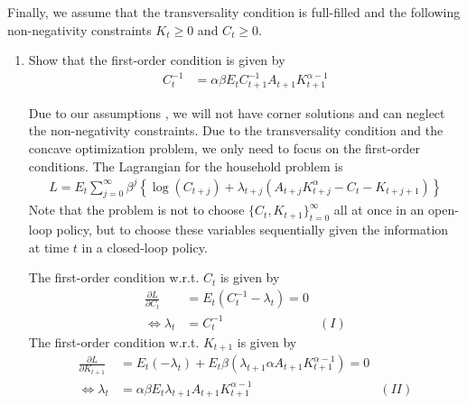 \documentclass[a4paper]{scrartcl}
\begin{document}
    Finally, we assume that the transversality condition is full-filled and the following non-negativity constraints $K_t \geq0$ and $C_t \geq 0$.
    
    \begin{enumerate}
        \item Show that the first-order condition is given by
              \begin{align*}
                  C_t^{-1} & = \alpha \beta E_t C_{t+1}^{-1} A_{t+1} K_{t+1}^{\alpha-1}
              \end{align*}
              \begin{solution}
                  Due to our assumptions , we will not have corner solutions and can neglect the non-negativity constraints. Due to the transversality condition and the concave optimization problem, we only need to focus on the first-order conditions. 
                  The Lagrangian for the household problem is
                  \begin{align*}
                      L = E_t\sum_{j=0}^{\infty}\beta^j\left\{\log(C_{t+j}) + \lambda_{t+j} \left(A_{t+j}K_{t+j}^\alpha -C_t - K_{t+j+1}\right)\right\}
                  \end{align*}
                  Note that the problem is not to choose $\{C_t,K_{t+1}\}_{t=0}^\infty$ all at once in an open-loop policy, but to choose these variables sequentially given the information at time $t$ in a closed-loop policy.
                  
                  The first-order condition w.r.t. $C_t$ is given by
                  \begin{align*}
                      \frac{\partial L}{\partial C_{t}} & = E_t \left(C_t^{-1}-\lambda_{t}\right) = 0       \\
                      \Leftrightarrow \lambda_{t}       & = C_{t}^{-1}                                & (I)
                  \end{align*}
                  The first-order condition w.r.t. $K_{t+1}$ is given by
                  \begin{align*}
                      \frac{\partial L}{\partial K_{t+1}} & = E_t (-\lambda_{t}) + 
                      E_t \beta \left(\lambda_{t+1}\alpha A_{t+1} K_{t+1}^{\alpha-1}\right) = 0                              \\
                      \Leftrightarrow \lambda_{t}         & = \alpha\beta E_t \lambda_{t+1}A_{t+1} K_{t+1}^{\alpha-1} & (II)
                  \end{align*}
                  

\end{solution}
\end{enumerate}
\end{document}
